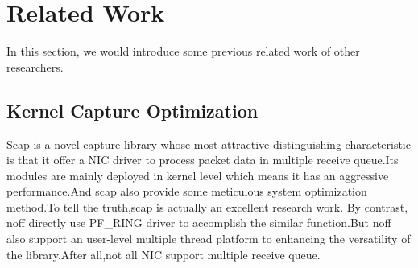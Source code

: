 \documentclass[conference]{IEEEtran}
\begin{document}
%



\section{Related Work}
In this section, we would introduce some previous related work of other researchers.

\subsection{Kernel Capture Optimization}
Scap\cite{Papadogiannakis} is a novel capture library whose most attractive distinguishing characteristic is that it offer a NIC driver to process packet data in multiple receive queue.Its modules are mainly deployed in kernel level which means it has an aggressive performance.And scap also provide some  meticulous system optimization method.To tell the truth,scap is actually an excellent research work. By contrast, noff directly use PF\_RING driver to accomplish the similar function.But noff also support an user-level multiple thread platform to enhancing the versatility of the library.After all,not all NIC support multiple receive queue.
\end{document}
